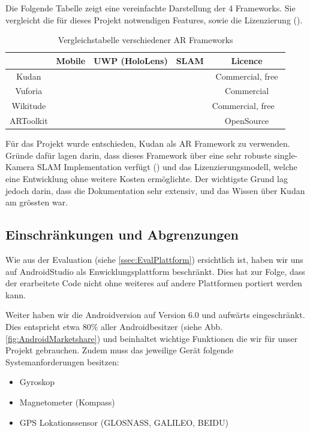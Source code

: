 \documentclass[a4paper]{scrreprt}
\newcommand{\xmark}{\ding{55}}
\begin{document}
Die Folgende Tabelle zeigt eine vereinfachte Darstellung der 4 Frameworks. Sie vergleicht die für dieses Projekt notwendigen Features, sowie die Lizenzierung (\cite{DDIDevelopment}).

\begin{table}[h!]
	\center
	\begin{tabular}{|c|c|c|c|c|}
		\hline
		& \textbf{Mobile} & \textbf{UWP (HoloLens)} & \textbf{SLAM} & \textbf{Licence} \\
		\hline
		Kudan & \checkmark & \xmark & \checkmark & Commercial, free \\
		\hline
		Vuforia & \checkmark & \checkmark & \checkmark & Commercial \\
		\hline
		Wikitude & \checkmark & \checkmark & \checkmark & Commercial, free \ \\
		\hline
		ARToolkit & \checkmark & \xmark & \xmark & OpenSource \\
		\hline
	\end{tabular}
	\caption{Vergleichstabelle verschiedener AR Frameworks}
\end{table}


Für das Projekt wurde entschieden, Kudan als AR Framework zu verwenden. Gründe dafür lagen darin, dass dieses Framework über eine sehr robuste single-Kamera SLAM Implementation verfügt (\cite{BerfinAyhan2017}) und das Lizenzierungsmodell, welche eine Entwicklung ohne weitere Kosten ermöglichte. Der wichtigste Grund lag jedoch darin, dass die Dokumentation sehr extensiv, und das Wissen über Kudan am grössten war.

\subsection{Einschränkungen und Abgrenzungen}

Wie aus der Evaluation (siehe \ref{ssec:EvalPlattform}) ersichtlich ist, haben wir uns  auf AndroidStudio als Enwicklungsplattform beschränkt. Dies hat zur Folge, dass der erarbeitete Code nicht ohne weiteres auf andere Plattformen portiert werden kann. 

Weiter haben wir die Androidversion auf Version 6.0 und aufwärts eingeschränkt. Dies entspricht etwa 80\% aller Androidbesitzer (siehe Abb. \ref{fig:AndroidMarketshare}) und beinhaltet wichtige Funktionen die wir für unser Projekt gebrauchen. Zudem muss das jeweilige Gerät folgende Systemanforderungen besitzen:
\begin{itemize}
	\item Gyroskop
	\item Magnetometer (Kompass)
	\item GPS Lokationssensor (GLOSNASS, GALILEO, BEIDU)
\end{itemize}
\end{document}
